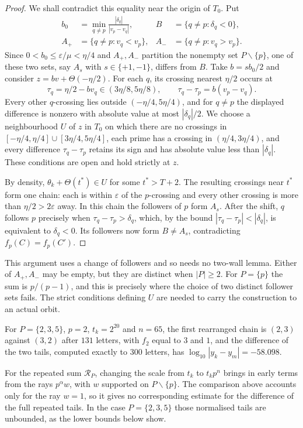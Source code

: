 \documentclass[11pt]{article}
\theoremstyle{remark}
\theoremstyle{plain}
\begin{document}
\begin{proof}
We shall contradict this equality near the origin of $T_0$. Put
\[
 \begin{aligned}
 b_0&=\min_{q\ne p}\frac{|\delta_q|}{|v_p-v_q|},
 &B&=\{q\ne p:\delta_q<0\},\\
 A_+&=\{q\ne p:v_q<v_p\},
 &A_-&=\{q\ne p:v_q>v_p\}.
 \end{aligned}
\]
Since $0<b_0\le\varepsilon/\mu<\eta/4$ and $A_+,A_-$ partition the
nonempty set $P\smallsetminus\{p\}$, one of these two sets, say $A_s$ with
$s\in\{+1,-1\}$, differs from $B$. Take $b=sb_0/2$ and consider
$z=bv+\Theta(-\eta/2)$. For each $q$, its crossing nearest $\eta/2$
occurs at
\[
 \tau_q=\eta/2-bv_q\in(3\eta/8,5\eta/8),\qquad
 \tau_q-\tau_p=b(v_p-v_q).
\]
Every other $q$-crossing lies outside $(-\eta/4,5\eta/4)$, and for
$q\ne p$ the displayed difference is nonzero with absolute value at most
$|\delta_q|/2$. We choose a neighbourhood $U$ of $z$ in $T_0$ on which
there are no crossings in $[-\eta/4,\eta/4]\cup[3\eta/4,5\eta/4]$,
each prime has a crossing in $(\eta/4,3\eta/4)$, and every difference
$\tau_q-\tau_p$ retains its sign and has absolute value less than
$|\delta_q|$. These conditions are open and hold strictly at $z$.

By density, $\theta_k+\Theta(t^*)\in U$ for some $t^*>T+2$. The resulting
crossings near $t^*$ form one chain: each is within $\varepsilon$ of
the $p$-crossing and every other crossing is more than
$\eta/2>2\varepsilon$ away. In this chain the followers of $p$ form
$A_s$. After the shift, $q$ follows $p$ precisely when
$\tau_q-\tau_p>\delta_q$, which, by the bound
$|\tau_q-\tau_p|<|\delta_q|$, is equivalent to $\delta_q<0$.
Its followers now form $B\ne A_s$, contradicting $f_p(C)=f_p(C')$.
\end{proof}

This argument uses a change of followers and so needs no two-wall lemma.
Either of $A_+,A_-$ may be empty, but they are distinct when $|P|\ge2$.
For $P=\{p\}$ the sum is $p/(p-1)$, and this is precisely where the choice
of two distinct follower sets fails. The strict conditions defining $U$
are needed to carry the construction to an actual orbit.

For $P=\{2,3,5\}$, $p=2$,
$t_k=2^{20}$ and $n=65$, the first rearranged chain is $(2,3)$ against
$(3,2)$ after $131$ letters, with $f_2$ equal to $3$ and $1$, and the
difference of the two tails, computed exactly to $300$ letters, has
$\log_{10}|y_k-y_m|=-58.098$.

For the repeated sum $\mathcal R_P$, changing the scale from $t_k$ to
$t_kp^n$ brings in early terms from the rays $p^\alpha w$, with $w$
supported on $P\smallsetminus\{p\}$. The comparison above accounts only for
the ray $w=1$, so it gives no corresponding estimate for the difference
of the full repeated tails. In the case $P=\{2,3,5\}$ those normalised
tails are unbounded, as the lower bounds below show.
\end{document}
